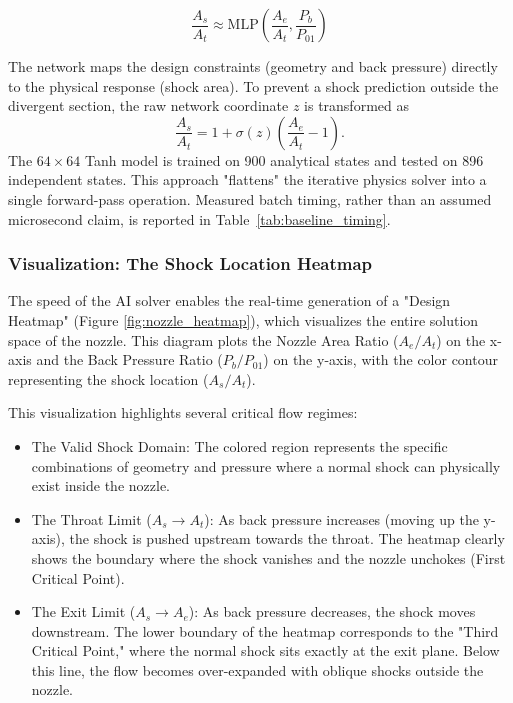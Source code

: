 \documentclass[preprint,12pt]{elsarticle}
\newcommand{\rev}[1]{#1}
\newenvironment{revision}{}{}
\newcommand{\rev}[1]{\textcolor{revisionblue}{#1}}
\newenvironment{revision}{\color{revisionblue}}{}
\begin{document}
\begin{equation}
    \frac{A_s}{A_t} \approx \text{MLP}\left( \frac{A_e}{A_t}, \frac{P_b}{P_{01}} \right)
\end{equation}

The network maps the design constraints (geometry and back pressure) directly to the physical response (shock area).
\begin{revision}
To prevent a shock prediction outside the divergent section, the raw network coordinate $z$ is transformed as
\begin{equation}
\frac{A_s}{A_t}=1+\sigma(z)\left(\frac{A_e}{A_t}-1\right).
\label{eq:nozzle_bound}
\end{equation}
The $64\times64$ Tanh model is trained on 900 analytical states and tested on 896 independent states.
\end{revision}
This approach "flattens" the iterative physics solver into a single forward-pass operation. \rev{Measured batch timing, rather than an assumed microsecond claim, is reported in Table~\ref{tab:baseline_timing}.}




\subsubsection{Visualization: The Shock Location Heatmap}



The speed of the AI solver enables the real-time generation of a "Design Heatmap" (Figure \ref{fig:nozzle_heatmap}), which visualizes the entire solution space of the nozzle. This diagram plots the Nozzle Area Ratio ($A_e/A_t$) on the x-axis and the Back Pressure Ratio ($P_b/P_{01}$) on the y-axis, with the color contour representing the shock location ($A_s/A_t$).

This visualization highlights several critical flow regimes:
\begin{itemize}
    \item The Valid Shock Domain: The colored region represents the specific combinations of geometry and pressure where a normal shock can physically exist inside the nozzle.
    \item The Throat Limit ($A_s \to A_t$): As back pressure increases (moving up the y-axis), the shock is pushed upstream towards the throat. The heatmap clearly shows the boundary where the shock vanishes and the nozzle unchokes (First Critical Point).
    \item The Exit Limit ($A_s \to A_e$): As back pressure decreases, the shock moves downstream. The lower boundary of the heatmap corresponds to the "Third Critical Point," where the normal shock sits exactly at the exit plane. Below this line, the flow becomes over-expanded with oblique shocks outside the nozzle.
\end{itemize}
\end{document}
